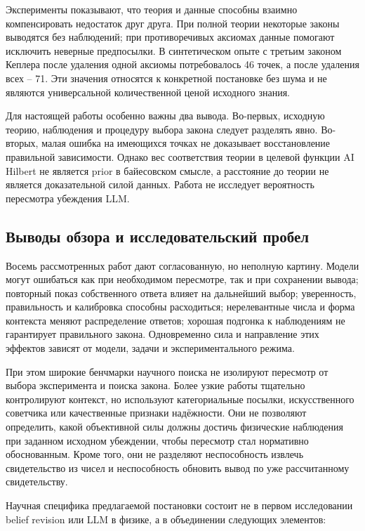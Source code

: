 \documentclass[a4paper,14pt]{extarticle}
\begin{document}
Эксперименты показывают, что теория и данные способны взаимно компенсировать недостаток друг друга. При полной теории некоторые законы выводятся без наблюдений; при противоречивых аксиомах данные помогают исключить неверные предпосылки. В синтетическом опыте с третьим законом Кеплера после удаления одной аксиомы потребовалось 46 точек, а после удаления всех -- 71. Эти значения относятся к конкретной постановке без шума и не являются универсальной количественной ценой исходного знания.

Для настоящей работы особенно важны два вывода. Во-первых, исходную теорию, наблюдения и процедуру выбора закона следует разделять явно. Во-вторых, малая ошибка на имеющихся точках не доказывает восстановление правильной зависимости. Однако вес соответствия теории в целевой функции AI Hilbert не является prior в байесовском смысле, а расстояние до теории не является доказательной силой данных. Работа не исследует вероятность пересмотра убеждения LLM.

\subsection{Выводы обзора и исследовательский пробел}

Восемь рассмотренных работ дают согласованную, но неполную картину. Модели могут ошибаться как при необходимом пересмотре, так и при сохранении вывода; повторный показ собственного ответа влияет на дальнейший выбор; уверенность, правильность и калибровка способны расходиться; нерелевантные числа и форма контекста меняют распределение ответов; хорошая подгонка к наблюдениям не гарантирует правильного закона. Одновременно сила и направление этих эффектов зависят от модели, задачи и экспериментального режима.

При этом широкие бенчмарки научного поиска не изолируют пересмотр от выбора эксперимента и поиска закона. Более узкие работы тщательно контролируют контекст, но используют категориальные посылки, искусственного советчика или качественные признаки надёжности. Они не позволяют определить, какой объективной силы должны достичь физические наблюдения при заданном исходном убеждении, чтобы пересмотр стал нормативно обоснованным. Кроме того, они не разделяют неспособность извлечь свидетельство из чисел и неспособность обновить вывод по уже рассчитанному свидетельству.

Научная специфика предлагаемой постановки состоит не в первом исследовании belief revision или LLM в физике, а в объединении следующих элементов:
\end{document}
